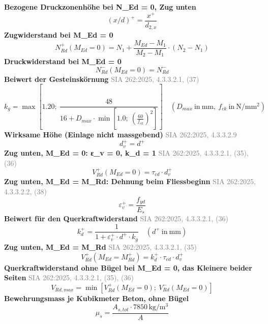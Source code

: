 \documentclass[11pt,a4paper]{article}
\newcommand{\normref}[1]{{\small\textcolor{gray}{#1}}}
\begin{document}
\noindent\textbf{Bezogene Druckzonenhöhe bei N\_Ed = 0, Zug unten}
\begin{equation*}
\left(x/d\right)^{+} = \frac{x^{+}}{d_{2,x}}
\end{equation*}
\noindent\textbf{Zugwiderstand bei M\_Ed = 0}
\begin{equation*}
N_{Rd}^{+}(M_{Ed} = 0) = N_1 + \frac{M_{Ed} - M_1}{M_2 - M_1} \cdot \left(N_2 - N_1\right)
\end{equation*}
\noindent\textbf{Druckwiderstand bei M\_Ed = 0}
\begin{equation*}
N_{Rd}^{-}(M_{Ed} = 0) = N_{Rd}^{-}
\end{equation*}
\noindent\textbf{Beiwert der Gesteinskörnung} \hfill \normref{SIA 262:2025, 4.3.3.2.1, (37)}
\begin{equation*}
k_g = \max\left[1.20;\ \frac{48}{16 + D_{max} \cdot \min\left[1.0;\ \left(\frac{60}{f_{ck}}\right)^{2}\right]}\right] \quad \left(D_{max}\ \text{in}\ \mathrm{mm},\ f_{ck}\ \text{in}\ \mathrm{N}/\mathrm{mm}^{2}\right)
\end{equation*}
\noindent\textbf{Wirksame Höhe (Einlage nicht massgebend)} \hfill \normref{SIA 262:2025, 4.3.3.2.9}
\begin{equation*}
d_v^{+} = d^{+}
\end{equation*}
\noindent\textbf{Zug unten, M\_Ed = 0: ε\_v = 0, k\_d = 1} \hfill \normref{SIA 262:2025, 4.3.3.2.1, (35), (36)}
\begin{equation*}
V_{Rd}^{+}(M_{Ed} = 0) = \tau_{cd} \cdot d_v^{+}
\end{equation*}
\noindent\textbf{Zug unten, M\_Ed = M\_Rd: Dehnung beim Fliessbeginn} \hfill \normref{SIA 262:2025, 4.3.3.2.2, (38)}
\begin{equation*}
\varepsilon_v^{+} = \frac{f_{yd}}{E_s}
\end{equation*}
\noindent\textbf{Beiwert für den Querkraftwiderstand} \hfill \normref{SIA 262:2025, 4.3.3.2.1, (36)}
\begin{equation*}
k_d^{+} = \frac{1}{1 + \varepsilon_v^{+} \cdot d^{+} \cdot k_g} \quad \left(d^{+}\ \text{in}\ \mathrm{mm}\right)
\end{equation*}
\noindent\textbf{Zug unten, M\_Ed = M\_Rd} \hfill \normref{SIA 262:2025, 4.3.3.2.1, (35)}
\begin{equation*}
V_{Rd}^{+}(M_{Ed} = M_{Rd}^{+}) = k_d^{+} \cdot \tau_{cd} \cdot d_v^{+}
\end{equation*}
\noindent\textbf{Querkraftwiderstand ohne Bügel bei M\_Ed = 0, das Kleinere beider Seiten} \hfill \normref{SIA 262:2025, 4.3.3.2.1, (35), (36)}
\begin{equation*}
V_{Rd,max} = \min\left[V_{Rd}^{+}(M_{Ed} = 0);\ V_{Rd}^{-}(M_{Ed} = 0)\right]
\end{equation*}
\noindent\textbf{Bewehrungsmass je Kubikmeter Beton, ohne Bügel}
\begin{equation*}
\mu_s = \frac{A_{s,tot} \cdot 7850\,\mathrm{kg}/\mathrm{m}^{3}}{A}
\end{equation*}
\end{document}
